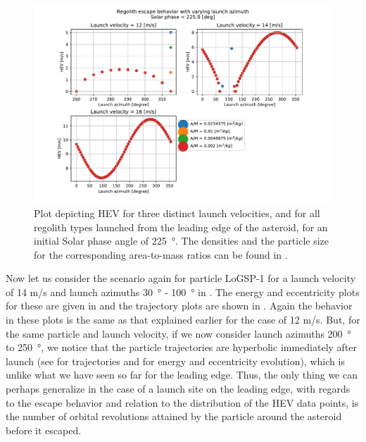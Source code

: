 \begin{figure}[!h]
\centering
\captionsetup{justification=centering}
\includegraphics[width=\textwidth, height=0.5\textheight, keepaspectratio=true]{leading_edge_perturbations/hev_255solarPhase.pdf}
\caption{Plot depicting \gls{HEV} for three distinct launch velocities, and for all regolith types launched from the leading edge of the asteroid, for an initial Solar phase angle of \SI{225}{\degree}. The densities and the particle size for the corresponding area-to-mass ratios can be found in .}
\label{fig:leadingEdge_allParticles_hev_225solarPhase}
\end{figure}
\FloatBarrier
Now let us consider the scenario again for particle LoGSP-1 for a launch velocity of 14 m/s and launch azimuths \SI{30}{\degree} - \SI{100}{\degree} in . The energy and eccentricity plots for these are given in  and the trajectory plots are shown in . Again the behavior in these plots is the same as that explained earlier for the case of 12 m/s. But, for the same particle and launch velocity, if we now consider launch azimuths \SI{200}{\degree} to \SI{250}{\degree}, we notice that the particle trajectories are hyperbolic immediately after launch (see  for trajectories and  for energy and eccentricity evolution), which is unlike what we have seen so far for the leading edge. Thus, the only thing we can perhaps generalize in the case of a launch site on the leading edge, with regards to the escape behavior and relation to the distribution of the \gls{HEV} data points, is the number of orbital revolutions attained by the particle around the asteroid before it escaped.
